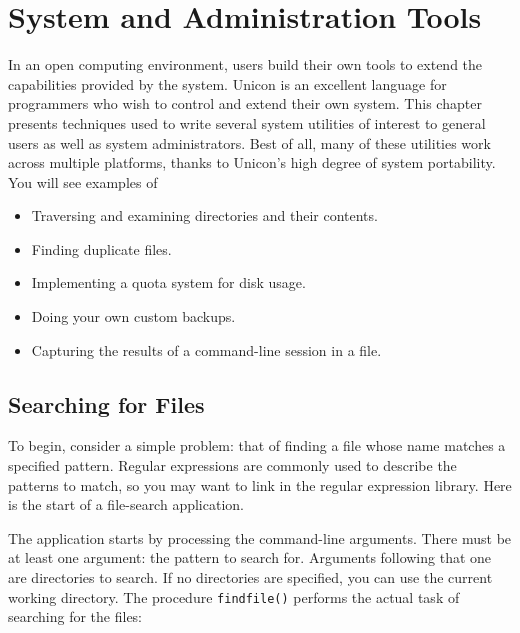 \chapter{System and Administration Tools}

In an open computing environment, users build their own tools to extend
the capabilities provided by the system. Unicon is an excellent
language for programmers who wish to control and extend their own
system. This chapter presents techniques used to write several
system utilities of interest to general users as well as system
administrators. Best of all, many of these utilities work across
multiple platforms, thanks to Unicon's high degree of
system portability. You will see examples of

\begin{itemize}
\item Traversing and examining directories and their contents.
\item Finding duplicate files.
\item Implementing a quota system for disk usage.
\item Doing your own custom backups.
\item Capturing the results of a command-line session in a file.
\end{itemize}

\section{Searching for Files}

To begin, consider a simple problem: that of finding a file whose name
matches a specified pattern. Regular expressions are commonly used to
describe the patterns to match, so you may want to link in the regular
expression library. Here is the start of a file-search application.


The application starts by processing the
command-line arguments. There must be at least
one argument: the pattern to search for. Arguments following that one
are directories to search. If no directories are specified, you can use
the current working directory. The procedure
\texttt{findfile()} performs the actual task of searching for the
files:

